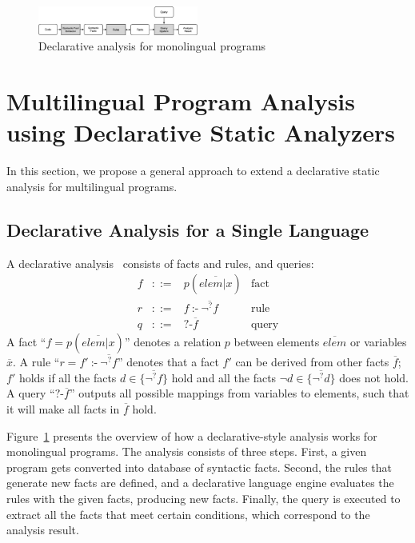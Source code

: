 \begin{figure}[t]
  \centering
  \vspace{2mm}
  \includegraphics[width=0.47\textwidth]{img/ov1.png}
  \caption{Declarative analysis for monolingual programs}
  \label{fig:ov1}
\end{figure}

\section{Multilingual Program Analysis using Declarative Static Analyzers}
\label{sec:approach}

In this section, we propose a general approach to extend a declarative
static analysis for multilingual programs.

\subsection{Declarative Analysis for a Single Language}

A declarative analysis~\cite{doop} consists of facts and rules, and queries:
\[
  \begin{array}{llll}
f & ::= & p(\overline{elem | x}) & \mbox{fact}\\
r & ::= & f\ \mbox{:-}\ \overline{\neg^? f} & \mbox{rule}\\
q & ::= & \mbox{?-} \overline{f}\ &  \mbox{query}
\end{array}
\]
A fact ``$f = p(\overline{elem | x})$'' denotes a relation $p$
between elements $\overline{elem}$ or variables $\overline{x}$.
A rule ``$r = f'\ \mbox{:-}\ \overline{\neg^? f}$'' denotes that
a fact $f'$ can be derived from other facts $\overline{f}$;
$f'$ holds if all the facts $d \in \{\overline{\neg^? f}\}$ hold
and all the facts $\neg d \in \{\overline{\neg^? d}\}$ does not hold.
A query ``$\mbox{?-} \overline{f}$'' outputs all possible mappings from
variables to elements, such that it will make all facts in $\overline{f}$ hold.

Figure~\ref{fig:ov1} presents the overview of how a
declarative-style analysis works for monolingual programs.
The analysis consists of three steps.
First, a given program gets converted into database of syntactic facts.
Second, the rules that generate new facts are defined, and
a declarative language engine evaluates the rules with the given facts,
producing new facts.
Finally, the query is executed to extract all the facts that meet
certain conditions, which correspond to the analysis result.

